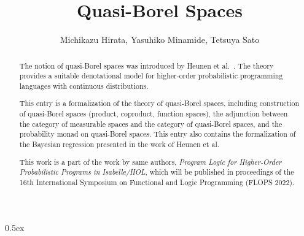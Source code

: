 \documentclass[11pt,a4paper]{article}
\begin{document}
\title{Quasi-Borel Spaces}
\author{Michikazu Hirata, Yasuhiko Minamide, Tetsuya Sato}
\maketitle

\begin{abstract}
  The notion of quasi-Borel spaces was introduced by Heunen et al.~\cite{Heunen_2017}.
  The theory provides a suitable denotational model
  for higher-order probabilistic programming languages with continuous distributions.

  This entry is a formalization of the theory of quasi-Borel spaces, including
  construction of quasi-Borel spaces (product, coproduct, function spaces),
  the adjunction between the category of measurable spaces and the category of quasi-Borel spaces,
  and the probability monad on quasi-Borel spaces.
  This entry also contains the formalization of the Bayesian regression presented in the work of Heunen et al.
  
  This work is a part of the work by same authors,
  \textit{Program Logic for Higher-Order Probabilistic Programs in Isabelle/HOL},
  which will be published in proceedings of the 16th International Symposium on Functional and Logic Programming (FLOPS 2022).
\end{abstract}

\tableofcontents

\parindent 0pt\parskip 0.5ex





\end{document}
